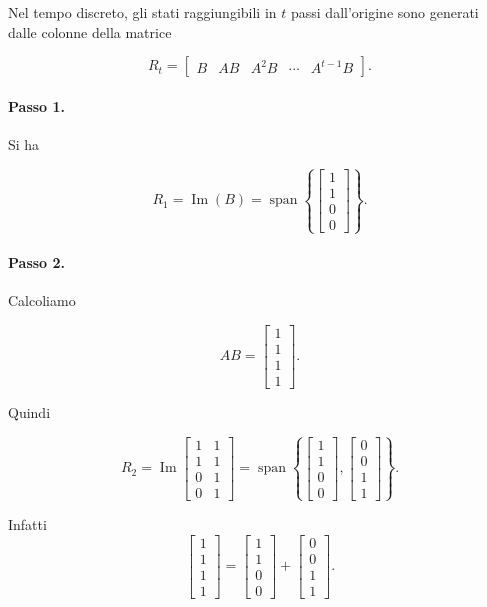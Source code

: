 Nel tempo discreto, gli stati raggiungibili in \(t\) passi dall'origine sono generati dalle colonne della matrice

\[
R_t=
\begin{bmatrix}
B & AB & A^2B & \cdots & A^{t-1}B
\end{bmatrix}.
\]

\paragraph{Passo 1.}
Si ha

\[
R_1 = \operatorname{Im}(B)
=
\operatorname{span}\left\{
\begin{bmatrix}
1\\1\\0\\0
\end{bmatrix}
\right\}.
\]

\paragraph{Passo 2.}
Calcoliamo

\[
AB=
\begin{bmatrix}
1\\1\\1\\1
\end{bmatrix}.
\]

Quindi

\[
R_2=
\operatorname{Im}
\begin{bmatrix}
1 & 1\\
1 & 1\\
0 & 1\\
0 & 1
\end{bmatrix}
=
\operatorname{span}\left\{
\begin{bmatrix}
1\\1\\0\\0
\end{bmatrix},
\begin{bmatrix}
0\\0\\1\\1
\end{bmatrix}
\right\}.
\]

Infatti
\[
\begin{bmatrix}
1\\1\\1\\1
\end{bmatrix}
=
\begin{bmatrix}
1\\1\\0\\0
\end{bmatrix}
+
\begin{bmatrix}
0\\0\\1\\1
\end{bmatrix}.
\]

